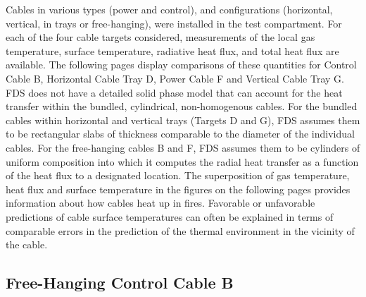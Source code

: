 Cables in various types (power and control), and configurations (horizontal, vertical, in trays or free-hanging), were installed in
the test compartment.
For each of the four cable targets considered, measurements of the local gas temperature, surface temperature, radiative heat flux,
and total heat flux are available.  The following pages display comparisons of these quantities for
Control Cable B, Horizontal Cable Tray D, Power Cable F and Vertical Cable Tray G.
FDS does not have a detailed solid phase model that can account for the heat transfer within the bundled,
cylindrical, non-homogenous cables.  For the bundled cables within horizontal and vertical trays (Targets D and G),
FDS assumes them to be rectangular slabs of thickness comparable to the diameter of the individual cables.
For the free-hanging cables B and F, FDS assumes them to be cylinders of uniform composition into which it
computes the radial heat transfer as a function of the heat flux to a designated location.
The superposition of gas temperature, heat flux and surface temperature in the figures on the following pages
provides information about how cables heat up in fires.  Favorable or unfavorable predictions of cable surface
temperatures can often be explained in terms of comparable errors in the prediction of the thermal environment in the vicinity of the cable.

\clearpage

\subsection{Free-Hanging Control Cable B}

\vspace{1in}


